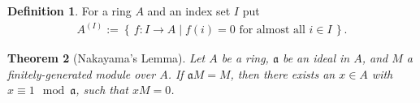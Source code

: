 \documentclass{book}
\theoremstyle{plain}
\newtheorem{thm}{Theorem}[chapter] %
\theoremstyle{definition}
\theoremstyle{custom_definition}
\newtheorem{defn}[thm]{Definition}
\newcommand{\makeset}[2]{\left\{\, #1 \mid #2 \,\right\}}
\begin{document}
\begin{defn}
    For a ring \(A\) and an index set \(I\) put
    \begin{align}
        A^{(I)} := \makeset{f: I \longrightarrow A}{f(i) = 0 \text{ for almost all } i \in I} \text{.}
    \end{align}
\end{defn}

\begin{thm}[Nakayama's Lemma]
    Let \(A\) be a ring, \(\mathfrak{a}\) be an ideal in \(A\), and \(M\) a finitely-generated module over \(A\). If \(\mathfrak{a}M = M\), then there exists an \(x \in A\) with \(x \equiv 1 \mod \mathfrak{a}\), such that \(x M = 0\).
\end{thm}
\end{document}
